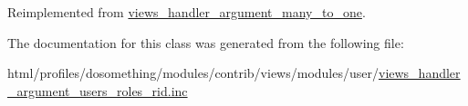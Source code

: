 Reimplemented from \hyperlink{classviews__handler__argument__many__to__one_a0b758f84ee6b9a473313ec92714b06c7}{views\_\-handler\_\-argument\_\-many\_\-to\_\-one}.

The documentation for this class was generated from the following file:\begin{DoxyCompactItemize}
\item 
html/profiles/dosomething/modules/contrib/views/modules/user/\hyperlink{views__handler__argument__users__roles__rid_8inc}{views\_\-handler\_\-argument\_\-users\_\-roles\_\-rid.inc}\end{DoxyCompactItemize}
